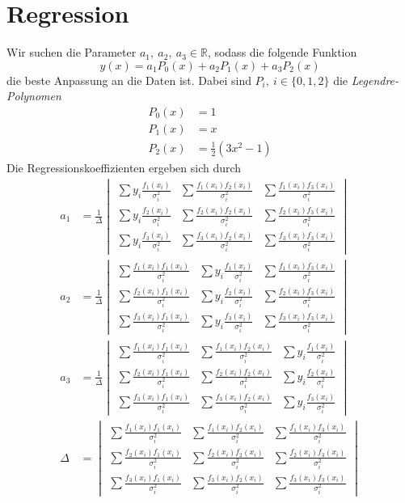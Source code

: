 \documentclass[prb,12pt]{revtex4-2}
\theoremstyle{definition}
\theoremstyle{definition}
\newcommand{\R}{\mathbb{R}}
\begin{document}
\section{Regression}
Wir suchen die Parameter $a_1,~a_2,~a_3\in \R$, sodass die folgende Funktion
\begin{equation}
	y(x)=a_1 P_0(x)+a_2 P_1(x)+a_3 P_2(x)
\end{equation}
die beste Anpassung an die Daten ist. Dabei sind $P_i,~i\in \{0,1,2\}$ die \emph{Legendre-Polynomen}
\begin{align*}
	P_0(x)&=1\\
	P_1(x)&=x\\
	P_2(x)&=\frac 12 (3x^2-1)
\end{align*}
Die Regressionskoeffizienten ergeben sich durch
\begin{align*}
	a_1&=\frac 1\Delta\begin{vmatrix}
		\sum y_i \frac{f_1(x_i)}{\sigma_i^2} & \sum \frac{f_1(x_i)f_2(x_i)}{\sigma_i^2} & \sum \frac{f_1(x_i)f_3(x_i)}{\sigma_i^2} \\
		\sum y_i \frac{f_2(x_i)}{\sigma_i^2} & \sum \frac{f_2(x_i)f_2(x_i)}{\sigma_i^2} & \sum \frac{f_2(x_i)f_3(x_i)}{\sigma_i^2} \\
		\sum y_i \frac{f_3(x_i)}{\sigma_i^2} & \sum \frac{f_3(x_i)f_2(x_i)}{\sigma_i^2} & \sum \frac{f_3(x_i)f_3(x_i)}{\sigma_i^2}
	\end{vmatrix}\\
	a_2&=\frac 1\Delta\begin{vmatrix}
	\sum \frac{f_1(x_i)f_1(x_i)}{\sigma_i^2} & \sum y_i \frac{f_1(x_i)}{\sigma_i^2} & \sum \frac{f_1(x_i)f_3(x_i)}{\sigma_i^2} \\
	\sum \frac{f_2(x_i)f_1(x_i)}{\sigma_i^2} & \sum y_i \frac{f_2(x_i)}{\sigma_i^2} & \sum \frac{f_2(x_i)f_3(x_i)}{\sigma_i^2} \\
	\sum \frac{f_3(x_i)f_1(x_i)}{\sigma_i^2} & \sum y_i \frac{f_3(x_i)}{\sigma_i^2} & \sum \frac{f_3(x_i)f_3(x_i)}{\sigma_i^2}
\end{vmatrix}\\
	a_3&=\frac 1\Delta\begin{vmatrix}
	\sum \frac{f_1(x_i)f_1(x_i)}{\sigma_i^2} & \sum \frac{f_1(x_i)f_2(x_i)}{\sigma_i^2} &  \sum y_i \frac{f_1(x_i)}{\sigma_i^2} \\
	\sum \frac{f_2(x_i)f_1(x_i)}{\sigma_i^2} & \sum \frac{f_2(x_i)f_2(x_i)}{\sigma_i^2} &  \sum y_i \frac{f_2(x_i)}{\sigma_i^2} \\
	\sum \frac{f_3(x_i)f_1(x_i)}{\sigma_i^2} & \sum \frac{f_3(x_i)f_2(x_i)}{\sigma_i^2} & \sum y_i \frac{f_3(x_i)}{\sigma_i^2}
\end{vmatrix}\\
	\Delta&=\begin{vmatrix}
		\sum \frac{f_1(x_i)f_1(x_i)}{\sigma_i^2} & \sum \frac{f_1(x_i)f_2(x_i)}{\sigma_i^2} & \sum \frac{f_1(x_i)f_3(x_i)}{\sigma_i^2} \\
		\sum \frac{f_2(x_i)f_1(x_i)}{\sigma_i^2} & \sum \frac{f_2(x_i)f_2(x_i)}{\sigma_i^2} & \sum \frac{f_2(x_i)f_3(x_i)}{\sigma_i^2} \\
		\sum \frac{f_3(x_i)f_1(x_i)}{\sigma_i^2} & \sum \frac{f_3(x_i)f_2(x_i)}{\sigma_i^2} & \sum \frac{f_3(x_i)f_3(x_i)}{\sigma_i^2}
	\end{vmatrix}
\end{align*}
\end{document}

